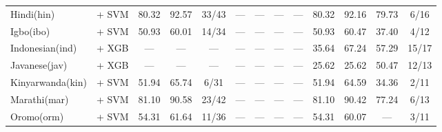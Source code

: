 \begin{table*}[h]
{\begin{tabular}{l|c|ccc|cccc|cccc}
            Hindi(hin)                              & \citep{wang2024multilingual}  + SVM                                                          & 80.32                        & 92.57                        & 33/43                       & —             & —             & —                 & —             & 80.32         & 92.16         & 79.73             & 6/16          \\
            Igbo(ibo)                               & \citep{wang2024multilingual}   + SVM                                                         & 50.93                        & 60.01                        & 14/34                       & —             & —             & —                 & —             & 50.93         & 60.47         & 37.40             & 4/12          \\
            Indonesian(ind)                         & \citep{wang2024multilingual}   + XGB                                                         & —                            & —                            & —                           & —             & —             & —                 & —             & 35.64         & 67.24         & 57.29             & 15/17         \\
            Javanese(jav)                           & \citep{wang2024multilingual}   + XGB                                                         & —                            & —                            & —                           & —             & —             & —                 & —             & 25.62         & 25.62         & 50.47             & 12/13         \\
            Kinyarwanda(kin)                        & \citep{wang2024multilingual}  + SVM                                                          & 51.94                        & 65.74                        & 6/31                        & —             & —             & —                 & —             & 51.94         & 64.59         & 34.36             & 2/11          \\
            Marathi(mar)                            & \citep{wang2024multilingual}   + SVM                                                         & 81.10                        & 90.58                        & 23/42                       & —             & —             & —                 & —             & 81.10         & 90.42         & 77.24             & 6/13          \\
            Oromo(orm)                              & \citep{wang2024multilingual}    + SVM                                                        & 54.31                        & 61.64                        & 11/36                       & —             & —             & —                 & —             & 54.31         & 60.07         & —                 & 3/11          \\

\end{tabular}}
\end{table*}
